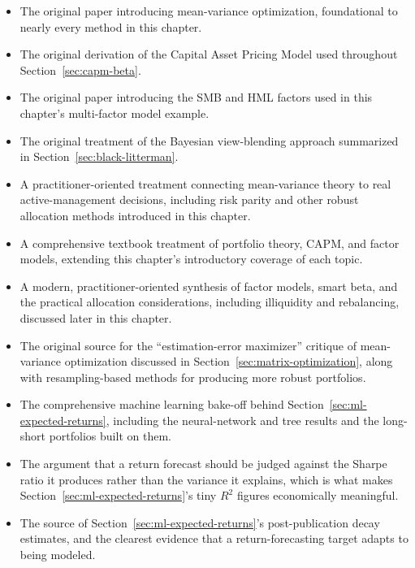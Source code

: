 \documentclass[../ai_in_finance]{subfiles}
\begin{document}
\begin{itemize}
    \item {} The original paper introducing mean-variance optimization, foundational to nearly every method in this chapter.
    \item {} The original derivation of the Capital Asset Pricing Model used throughout Section~\ref{sec:capm-beta}.
    \item {} The original paper introducing the SMB and HML factors used in this chapter's multi-factor model example.
    \item {} The original treatment of the Bayesian view-blending approach summarized in Section~\ref{sec:black-litterman}.
    \item {} A practitioner-oriented treatment connecting mean-variance theory to real active-management decisions, including risk parity and other robust allocation methods introduced in this chapter.
    \item {} A comprehensive textbook treatment of portfolio theory, CAPM, and factor models, extending this chapter's introductory coverage of each topic.
    \item {} A modern, practitioner-oriented synthesis of factor models, smart beta, and the practical allocation considerations, including illiquidity and rebalancing, discussed later in this chapter.
    \item {} The original source for the ``estimation-error maximizer'' critique of mean-variance optimization discussed in Section~\ref{sec:matrix-optimization}, along with resampling-based methods for producing more robust portfolios.
    \item {} The comprehensive machine learning bake-off behind Section~\ref{sec:ml-expected-returns}, including the neural-network and tree results and the long-short portfolios built on them.
    \item {} The argument that a return forecast should be judged against the Sharpe ratio it produces rather than the variance it explains, which is what makes Section~\ref{sec:ml-expected-returns}'s tiny $R^2$ figures economically meaningful.
    \item {} The source of Section~\ref{sec:ml-expected-returns}'s post-publication decay estimates, and the clearest evidence that a return-forecasting target adapts to being modeled.

\end{itemize}
\end{document}

